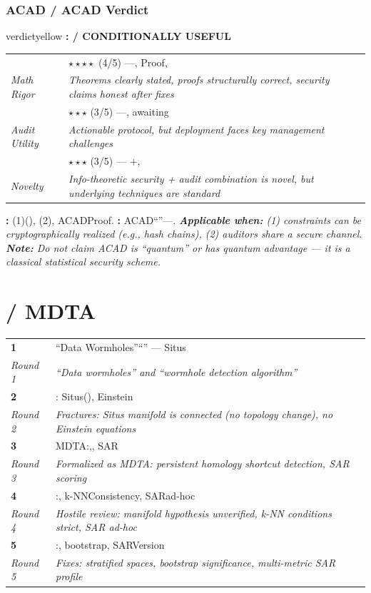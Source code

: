 \documentclass[11pt,a4paper]{article}
\theoremstyle{plain}
\theoremstyle{definition}
\theoremstyle{remark}
\begin{document}
{\section{ACAD / ACAD Verdict}
\label{sec:acad-verdict}
\begin{verdictbox}{verdictyellow}
\textbf{: / CONDITIONALLY USEFUL}
\medskip
\begin{tabular}{p{3cm} p{11cm}}
 & $\star\star\star\star$ (4/5) ---, Proof, \\
\textit{Math Rigor} & \textit{Theorems clearly stated, proofs structurally correct, security claims honest after fixes} \\
 & $\star\star\star$ (3/5) ---, awaiting \\
\textit{Audit Utility} & \textit{Actionable protocol, but deployment faces key management challenges} \\
 & $\star\star\star$ (3/5) --- +, \\
\textit{Novelty} & \textit{Info-theoretic security + audit combination is novel, but underlying techniques are standard} \\
\end{tabular}
\medskip
\textbf{: } (1)(), (2), ACADProof.
\textbf{: } ACAD``''---.
\textit{\textbf{Applicable when:} (1) constraints can be cryptographically realized (e.g., hash chains), (2) auditors share a secure channel. \textbf{Note:} Do not claim ACAD is ``quantum'' or has quantum advantage --- it is a classical statistical security scheme.}
\end{verdictbox}
\newpage
\part{ / MDTA}
\label{part:mdta}
\begin{scxbox}
\begin{tabular}{p{3cm} p{11cm}}
\textbf{1} & ``Data Wormholes''``'' --- Situs \\
\textit{Round 1} & \textit{``Data wormholes'' and ``wormhole detection algorithm''} \\
\textbf{2} & : Situs(), Einstein \\
\textit{Round 2} & \textit{Fractures: Situs manifold is connected (no topology change), no Einstein equations} \\
\textbf{3} & MDTA:,, SAR \\
\textit{Round 3} & \textit{Formalized as MDTA: persistent homology shortcut detection, SAR scoring} \\
\textbf{4} & :, k-NNConsistency, SARad-hoc \\
\textit{Round 4} & \textit{Hostile review: manifold hypothesis unverified, k-NN conditions strict, SAR ad-hoc} \\
\textbf{5} & :, bootstrap, SARVersion \\
\textit{Round 5} & \textit{Fixes: stratified spaces, bootstrap significance, multi-metric SAR profile} \\
\end{tabular}
\end{scxbox}
}
\end{document}
